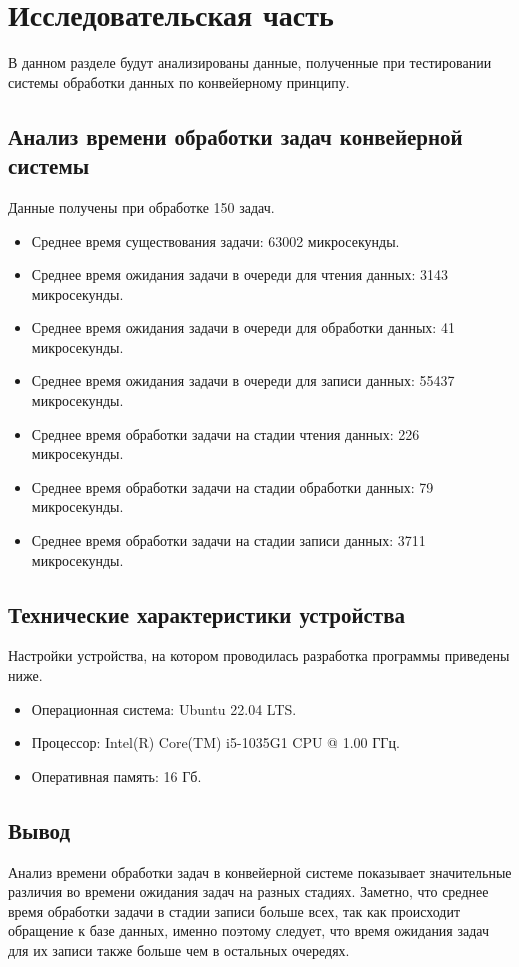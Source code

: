 \chapter{Исследовательская часть}
В данном разделе будут анализированы данные, полученные при тестировании системы обработки данных по конвейерному принципу.

\section{Анализ времени обработки задач конвейерной системы}
Данные получены при обработке 150 задач.
\begin{itemize}[label=---]
	\item Среднее время существования задачи: 63002 микросекунды.
	\item Среднее время ожидания задачи в очереди для чтения данных: 3143 микросекунды.
	\item Среднее время ожидания задачи в очереди для обработки данных: 41 микросекунды.
	\item Среднее время ожидания задачи в очереди для записи данных: 55437 микросекунды.
	\item Среднее время обработки задачи на стадии чтения данных: 226 микросекунды.
	\item Среднее время обработки задачи на стадии обработки данных: 79 микросекунды.
	\item Среднее время обработки задачи на стадии записи данных: 3711 микросекунды.
\end{itemize}

\section{Технические характеристики устройства}

Настройки устройства, на котором проводилась разработка программы приведены ниже.

\begin{itemize}[label=---]
	\item Операционная система: Ubuntu 22.04 LTS.
	\item Процессор: Intel(R) Core(TM) i5-1035G1 CPU @ 1.00 ГГц.
	\item Оперативная память: 16 Гб.
\end{itemize}

\section{Вывод}
Анализ времени обработки задач в конвейерной системе показывает значительные различия во времени ожидания задач на разных стадиях. Заметно, что среднее время обработки задачи в стадии записи больше всех, так как происходит обращение к базе данных, именно поэтому следует, что время ожидания задач для их записи также больше чем в остальных очередях.
